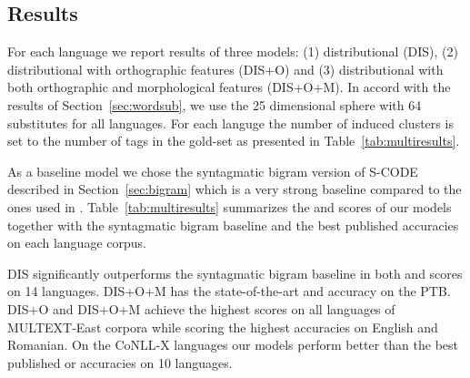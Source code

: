 \subsection{Results}
\label{sec:multires}

For each language we report results of three models: (1)
distributional (DIS), (2) distributional with orthographic features
(DIS+O) and (3) distributional with both orthographic and
morphological features (DIS+O+M).  In accord with the results of
Section~\ref{sec:wordsub}, we use the 25 dimensional sphere with 64
substitutes for all languages.  For each languge the number of induced
clusters is set to the number of tags in the gold-set as presented in
Table~\ref{tab:multiresults}.

As a baseline model we chose the syntagmatic bigram version of S-CODE
described in Section~\ref{sec:bigram} which is a very strong baseline
compared to the ones used in
\cite{christodoulopoulos-goldwater-steedman:2011:EMNLP}.
Table~\ref{tab:multiresults} summarizes the \mto and \vm scores of our
models together with the syntagmatic bigram baseline and the best
published accuracies on each language corpus.  

DIS significantly outperforms the syntagmatic bigram baseline in both
\mto and \vm scores on 14 languages.  DIS+O+M has the state-of-the-art
\mto and \vm accuracy on the PTB.  DIS+O and DIS+O+M achieve the
highest \mto scores on all languages of MULTEXT-East corpora while
scoring the highest \vm accuracies on English and Romanian.  On the
CoNLL-X languages our models perform better than the best published
\mto or \vm accuracies on 10 languages.

